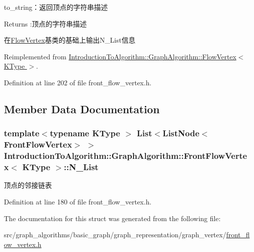 to\+\_\+string：返回顶点的字符串描述 

\begin{DoxyReturn}{Returns}
\+:顶点的字符串描述
\end{DoxyReturn}
在{\ttfamily \hyperlink{struct_introduction_to_algorithm_1_1_graph_algorithm_1_1_flow_vertex}{Flow\+Vertex}}基类的基础上输出{\ttfamily N\+\_\+\+List}信息 

Reimplemented from \hyperlink{struct_introduction_to_algorithm_1_1_graph_algorithm_1_1_flow_vertex_aa373a13a1fdee1fdcdbd0b55eaa1d1fb}{Introduction\+To\+Algorithm\+::\+Graph\+Algorithm\+::\+Flow\+Vertex$<$ K\+Type $>$}.



Definition at line 202 of file front\+\_\+flow\+\_\+vertex.\+h.



\subsection{Member Data Documentation}
\hypertarget{struct_introduction_to_algorithm_1_1_graph_algorithm_1_1_front_flow_vertex_ad66fead451e2af4756f0fd7a644e1319}{}
\subsubsection[{N\+\_\+\+List}]{\setlength{\rightskip}{0pt plus 5cm}template$<$typename K\+Type $>$ {\bf List}$<${\bf List\+Node}$<${\bf Front\+Flow\+Vertex}$>$ $>$ {\bf Introduction\+To\+Algorithm\+::\+Graph\+Algorithm\+::\+Front\+Flow\+Vertex}$<$ K\+Type $>$\+::N\+\_\+\+List}\label{struct_introduction_to_algorithm_1_1_graph_algorithm_1_1_front_flow_vertex_ad66fead451e2af4756f0fd7a644e1319}
顶点的邻接链表 

Definition at line 180 of file front\+\_\+flow\+\_\+vertex.\+h.



The documentation for this struct was generated from the following file\+:\begin{DoxyCompactItemize}
\item 
src/graph\+\_\+algorithms/basic\+\_\+graph/graph\+\_\+representation/graph\+\_\+vertex/\hyperlink{front__flow__vertex_8h}{front\+\_\+flow\+\_\+vertex.\+h}\end{DoxyCompactItemize}
